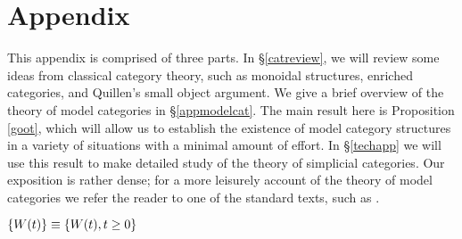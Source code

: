 \documentclass[12pt, final]{report}
\theoremstyle{definition}
\begin{document}




\appendix

\chapter{Appendix}

\setcounter{theorem}{0}
\setcounter{subsection}{0}

This appendix is comprised of three parts. In \S \ref{catreview}, we will review some ideas from classical category theory, such as monoidal structures, enriched categories, and Quillen's small object argument. We give a brief overview of the theory of model categories in \S \ref{appmodelcat}.
The main result here is Proposition \ref{goot}, which will allow us to establish the existence of model category structures in a variety of situations with a minimal amount of effort. In \S \ref{techapp} we will use this result to make detailed study of the theory of simplicial categories.
Our exposition is rather dense; for a more leisurely account of the theory of model categories we refer the reader to one of the standard texts, such as \cite{hovey}.

$\{W(t)\}\equiv \{W(t),t\geq 0\}\glossary{Wt@$W(t)$ & State or window
size of the source at time $t$}$


\end{document}
